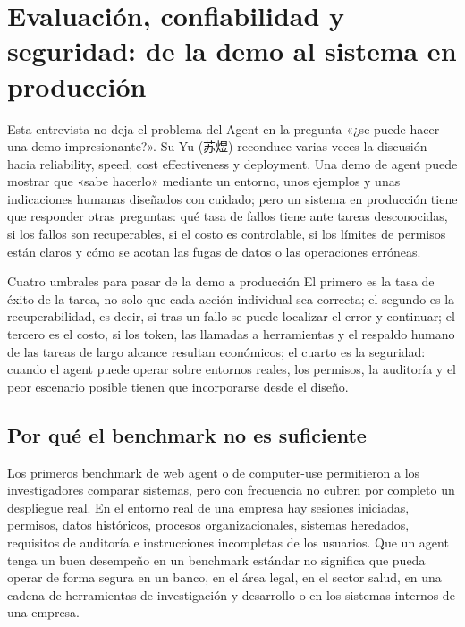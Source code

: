 \section{Evaluación, confiabilidad y seguridad: de la demo al sistema en producción}

Esta entrevista no deja el problema del Agent en la pregunta «¿se puede hacer una demo impresionante?». Su Yu (苏煜) reconduce varias veces la discusión hacia reliability, speed, cost effectiveness y deployment. Una demo de agent puede mostrar que «sabe hacerlo» mediante un entorno, unos ejemplos y unas indicaciones humanas diseñados con cuidado; pero un sistema en producción tiene que responder otras preguntas: qué tasa de fallos tiene ante tareas desconocidas, si los fallos son recuperables, si el costo es controlable, si los límites de permisos están claros y cómo se acotan las fugas de datos o las operaciones erróneas.

\begin{importantbox}{Cuatro umbrales para pasar de la demo a producción}
El primero es la tasa de éxito de la tarea, no solo que cada acción individual sea correcta; el segundo es la recuperabilidad, es decir, si tras un fallo se puede localizar el error y continuar; el tercero es el costo, si los token, las llamadas a herramientas y el respaldo humano de las tareas de largo alcance resultan económicos; el cuarto es la seguridad: cuando el agent puede operar sobre entornos reales, los permisos, la auditoría y el peor escenario posible tienen que incorporarse desde el diseño.
\end{importantbox}

\subsection{Por qué el benchmark no es suficiente}

Los primeros benchmark de web agent o de computer-use permitieron a los investigadores comparar sistemas, pero con frecuencia no cubren por completo un despliegue real. En el entorno real de una empresa hay sesiones iniciadas, permisos, datos históricos, procesos organizacionales, sistemas heredados, requisitos de auditoría e instrucciones incompletas de los usuarios. Que un agent tenga un buen desempeño en un benchmark estándar no significa que pueda operar de forma segura en un banco, en el área legal, en el sector salud, en una cadena de herramientas de investigación y desarrollo o en los sistemas internos de una empresa.

